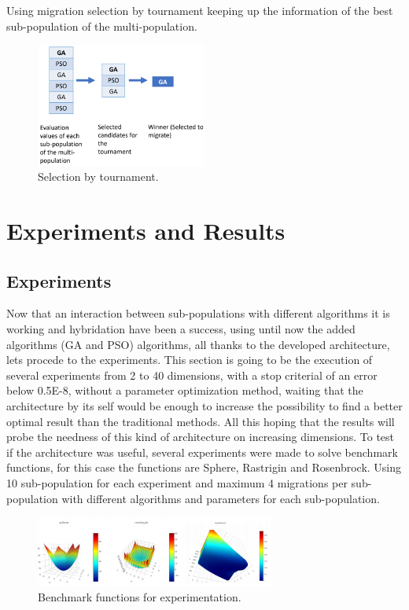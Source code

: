 \documentclass[runningheads]{llncs}
\begin{document}
  Using migration selection by tournament keeping up the information of the best
  sub-population of the multi-population.

\begin{figure}[htp]
  \centering
  \includegraphics[width=0.5\textwidth]{img/selection.png}
  \caption{Selection by tournament.} \label{fig1}
  \end{figure}


\section{Experiments and Results}
\subsection{Experiments}
Now that an interaction between sub-populations with different algorithms it is
working and  hybridation have been a success, using until now the added
algorithms (GA and PSO) algorithms, all thanks to the developed architecture,
lets procede to the experiments. This section is going to be the execution of
several experiments from 2 to 40 dimensions, with a stop criterial of an error
below  0.5E-8, without a parameter optimization method, waiting that the
architecture by its self would be enough to increase the possibility to find a
better optimal result than the traditional methods. All this hoping that the
results will probe the needness of this kind of architecture on increasing
dimensions. To test if the architecture was useful, several experiments were
made to solve benchmark functions, for this case the functions are Sphere,
Rastrigin and Rosenbrock. Using 10 sub-population for each experiment and
maximum 4 migrations per sub-population with different algorithms and parameters
for each sub-population.

\begin{figure}[htp]
  \centering
    \includegraphics[width=0.7\textwidth]{img/benchmark.png}
    \caption{Benchmark functions for experimentation.} \label{fig1}
    \end{figure}
\end{document}
